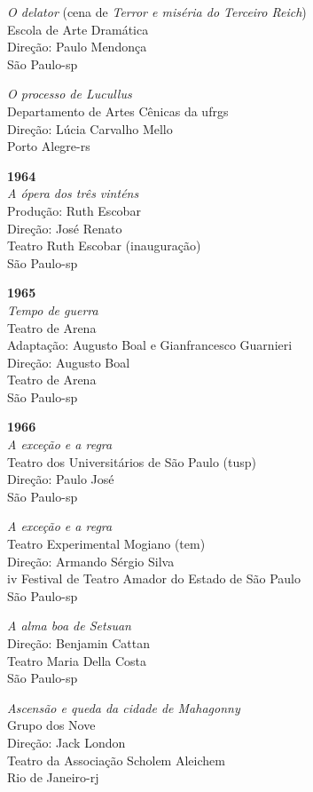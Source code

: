 {\it O delator} (cena de {\it Terror e miséria do Terceiro Reich})\\
Escola de Arte Dramática\\
Direção: Paulo Mendonça\\
São Paulo-{\sc sp}

{\it O processo de Lucullus}\\
Departamento de Artes Cênicas da {\sc ufrgs}\\
Direção: Lúcia Carvalho Mello\\
Porto Alegre-{\sc rs}

\item{\bf 1964}\\
{\it A ópera dos três vinténs}\\
Produção: Ruth Escobar\\
Direção: José Renato\\
Teatro Ruth Escobar (inauguração)\\
São Paulo-{\sc sp}

\item{\bf 1965}\\
{\it Tempo de guerra}\\
Teatro de Arena\\
Adaptação: Augusto Boal e Gianfrancesco Guarnieri\\
Direção: Augusto Boal\\
Teatro de Arena\\
São Paulo-{\sc sp}

\item{\bf 1966}\\
{\it A exceção e a regra}\\
Teatro dos Universitários de São Paulo ({\sc tusp})\\
Direção: Paulo José\\
São Paulo-{\sc sp}

{\it A exceção e a regra}\\
Teatro Experimental Mogiano ({\sc tem})\\
Direção: Armando Sérgio Silva\\
{\sc iv} Festival de Teatro Amador do Estado de São Paulo\\
São Paulo-{\sc sp}

{\it A alma boa de Setsuan}\\
Direção: Benjamin Cattan\\
Teatro Maria Della Costa\\
São Paulo-{\sc sp}

{\it Ascensão e queda da cidade de Mahagonny}\\
Grupo dos Nove\\
Direção: Jack London\\
Teatro da Associação Scholem Aleichem\\
Rio de Janeiro-{\sc rj}

